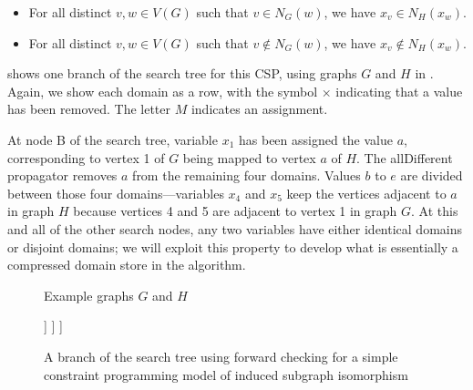 \begin{itemize}
    \item For all distinct $v, w \in V(G)$ such that $v \in N_G(w)$, we have 
$x_v \in N_H(x_w)$.
\item For all distinct $v, w \in V(G)$ such that $v \not\in N_G(w)$, we have 
$x_v \not\in N_H(x_w)$.
\end{itemize}

 shows one branch of the search tree for this CSP,
using graphs $G$ and $H$ in .  Again, we show
each domain as a row, with the symbol $\times$ indicating that a value
has been removed. The letter $M$ indicates an assignment.

At node B of the search tree, variable $x_1$ has been assigned the value $a$,
corresponding to vertex 1 of $G$ being mapped to vertex $a$ of $H$. The
allDifferent propagator removes $a$ from the remaining four domains.
Values $b$ to $e$ are divided between those four domains---variables
$x_4$ and $x_5$ keep the vertices adjacent to $a$ in graph $H$ because vertices 4 and
5 are adjacent to vertex 1 in graph $G$.  At this and all of the other search
nodes, any two variables have either identical domains or disjoint domains;
we will exploit this property to develop what is essentially a compressed
domain store in the \McSplit algorithm.

\begin{figure}[h!]
\centering
\caption{Example graphs $G$ and $H$}
\label{fig:intro-G-H}
\end{figure}

\begin{figure}[h!]
\centering
\begin{forest}
[\usebox{\MCSDomainsBoxA}
  [\usebox{\MCSDomainsBoxB}
    [\usebox{\MCSDomainsBoxC}
      [\usebox{\MCSDomainsBoxD}]%
    ]
  ]
]
\end{forest}
\caption{A branch of the search tree using forward checking for a simple constraint programming model
	of induced subgraph isomorphism}
\label{fig:SipDomains}
\end{figure}


